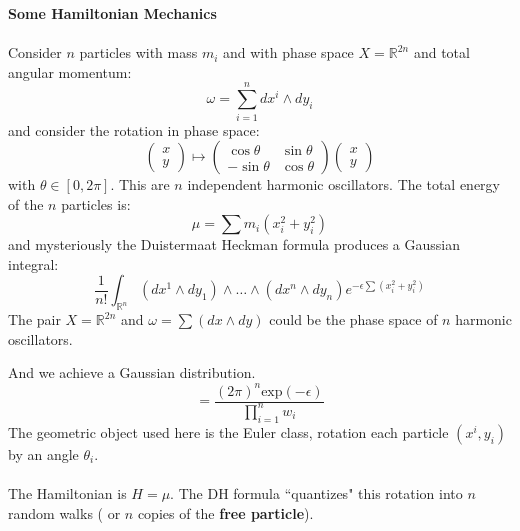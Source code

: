 \documentclass[12pt]{article}
\begin{document}
\noindent \textbf{Some Hamiltonian Mechanics}  \\ \\ Consider $n$ particles with mass $m_i$ and with phase space $X = \mathbb{R}^{2n}$ and total angular momentum:
$$ \omega = \sum_{i=1}^n dx^i \wedge dy_i $$
and consider the rotation in phase space:
$$ \left(\begin{array}{c} x \\ y \end{array} \right) \mapsto \left( \begin{array}{cc}
\cos \theta & \sin \theta \\ 
-\sin \theta & \cos \theta  \end{array}\right) \left(\begin{array}{c} x \\ y \end{array} \right)$$
with $\theta \in [0, 2\pi]$.  This are $n$ independent harmonic oscillators.  The total energy of the $n$ particles is:
$$ \mu = \sum m_i (x_i^2 + y_i^2) $$
and mysteriously the Duistermaat Heckman formula produces a Gaussian integral:
$$ \frac{1}{n!} \int_{\mathbb{R}^n}
(dx^1 \wedge dy_1)\wedge
\dots \wedge
(dx^n \wedge dy_n) e^{-\epsilon \sum (x_i^2 + y_i^2)}$$ 
The pair $X = \mathbb{R}^{2n}$ and $\omega = \sum (dx \wedge dy)$ could be the phase space of $n$ harmonic oscillators.  

\newpage \noindent And we achieve a Gaussian distribution.  
$$
= \frac{(2\pi)^n \mathrm{exp}(-\epsilon)}{\prod_{i=1}^n w_i}
 $$
The geometric object used here is the Euler class, rotation each particle $(x^i, y_i)$ by an angle $\theta_i$.   \\ \\ The Hamiltonian is $H = \mu$.  The DH formula ``quantizes" this rotation into $n$ random walks ( or $n$ copies of the \textbf{free particle}).

\newpage

\selectfont \fontsize{12}{10}\selectfont
\end{document}
